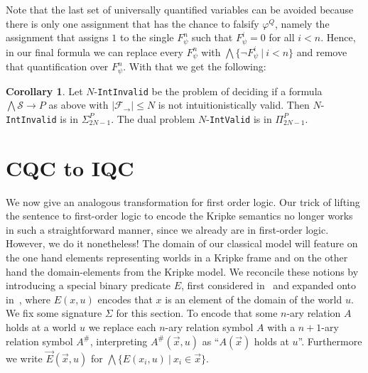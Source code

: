 \documentclass[a4paper,11pt]{report}
\theoremstyle{definition}
\theoremstyle{definition}
\newtheorem{corollary}[theorem]{Corollary}
\theoremstyle{definition}
\theoremstyle{definition}
\theoremstyle{definition}
\theoremstyle{definition}
\theoremstyle{definition}
\begin{document}
	Note that the last set of universally quantified variables can be avoided because there is only one assignment that has the chance to falsify $\varphi^Q$, namely the assignment that assigns $1$ to the single $F_\psi^n$ such that $F_\psi^i = 0$ for all $i < n$. Hence, in our final formula we can replace every $F_\psi^n$ with $\bigwedge\{\neg F_\psi^i\:|\:i < n\}$ and remove that quantification over $F_\psi^n$. With that we get the following:
	
	\begin{corollary}
		Let $N$-\verb+IntInvalid+ be the problem of deciding if a formula $\bigwedge \mathcal S\to P$ as above with $|\mathcal F_\to|\leq N$ is not intuitionistically valid. Then $N$-\verb+IntInvalid+ is in $\Sigma_{2N-1}^P$. The dual problem $N$-\verb+IntValid+ is in $\Pi_{2N-1}^P$.
	\end{corollary}
	
	\section{CQC to IQC}\label{section:CQCIQC}
	
	We now give an analogous transformation for first order logic. Our trick of lifting the sentence to first-order logic to encode the Kripke semantics no longer works in such a straightforward manner, since we already are in first-order logic. However, we do it nonetheless! The domain of our classical model will feature on the one hand elements representing worlds in a Kripke frame and on the other hand the domain-elements from the Kripke model. We reconcile these notions by introducing a special binary predicate $E$, first considered in~\cite{baaz2006skolemization} and expanded onto in~\cite{iemhoff2010eskolemization}, where $E(x, u)$ encodes that $x$ is an element of the domain of the world $u$. We fix some signature $\Sigma$ for this section. To encode that some $n$-ary relation $A$ holds at a world $u$ we replace each $n$-ary relation symbol $A$ with a $n+1$-ary relation symbol $A^\#$, interpreting $A^\#(\vec x, u)$ as ``$A(\vec x)$ holds at $u$''. Furthermore we write $\vec E(\vec x, u)$ for $\bigwedge\{E(x_i, u)\:|\:x_i\in \vec x\}$.
	
\end{document}
